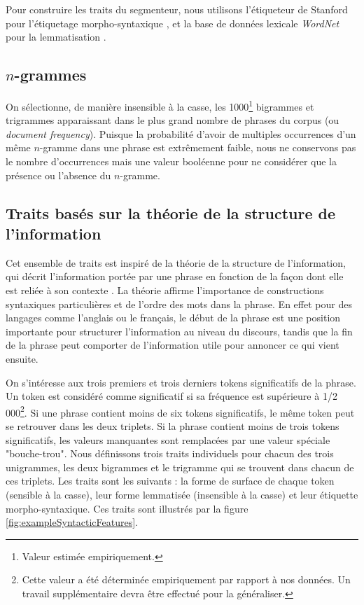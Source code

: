 Pour construire les traits du segmenteur, nous utilisons l'étiqueteur de Stanford pour l'étiquetage morpho-syntaxique \cite{toutanova2003feature}, et la base de données lexicale \textit{WordNet} pour la lemmatisation \cite{miller1995wordnet}.

\subsection{$n$-grammes}

On sélectionne, de manière insensible à la casse, les 1000\footnote{Valeur estimée empiriquement.} bigrammes et trigrammes apparaissant dans le plus grand nombre de phrases du corpus (ou \textit{document frequency}). Puisque la probabilité d'avoir de multiples occurrences d'un même $n$-gramme dans une phrase est extrêmement faible, nous ne conservons pas le nombre d'occurrences mais une valeur booléenne pour ne considérer que la présence ou l'absence du $n$-gramme.

\subsection{Traits basés sur la théorie de la structure de l'information}

Cet ensemble de traits est inspiré de la théorie de la structure de l'information, qui décrit l'information portée par une phrase en fonction de la façon dont elle est reliée à son contexte \cite{kruijff:1996}. La théorie affirme l'importance de constructions syntaxiques particulières et de l'ordre des mots dans la phrase. En effet pour des langages comme l'anglais ou le français, le début de la phrase est une position importante pour structurer l'information au niveau du discours, tandis que la fin de la phrase peut comporter de l'information utile pour annoncer ce qui vient ensuite. 

On s'intéresse aux trois premiers et trois derniers tokens significatifs de la phrase. Un token est considéré comme significatif si sa fréquence est supérieure à 1/2 000\footnote{Cette valeur a été déterminée empiriquement par rapport à nos données. Un travail supplémentaire devra être effectué pour la généraliser.}. Si une phrase contient moins de six tokens significatifs, le même token peut se retrouver dans les deux triplets. Si la phrase contient moins de trois tokens significatifs, les valeurs manquantes sont remplacées par une valeur spéciale "bouche-trou". Nous définissons trois traits individuels pour chacun des trois unigrammes, les deux bigrammes et le trigramme qui se trouvent dans chacun de ces triplets. Les traits sont les suivants : la forme de surface de chaque token (sensible à la casse), leur forme lemmatisée (insensible à la casse) et leur étiquette morpho-syntaxique. Ces traits sont illustrés par la figure \ref{fig:exampleSyntacticFeatures}.

